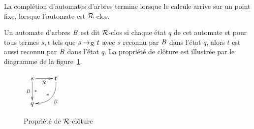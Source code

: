 




La complétion d'automates d'arbres termine lorsque le calcule arrive sur un point fixe,
lorsque l'automate est $\mathcal R$-clos.


\begin{definition}
  Un automate d'arbres $\mathit B$ est dit $\mathcal R$-clos si chaque état $q$ de cet automate et pour tous termes $s,t$ tels que 
  $s \rightarrow_\mathcal R t$ avec $s$ reconnu par $\mathit B$ dans l'état $q$, alors $t$ est aussi reconnu par $\mathit B$ dans l'état $q$.
  La propriété de clôture est illustrée par le diagramme de la figure~\ref{fig:R-cloture}.
  \begin{figure}[ht!]
    \centering
    $
    \xymatrix{
      s \ar[r]_{\R}\ar[d]^{*}_{\B} & t \ar@/^1.2pc/[ld]_{*}^{\B}\\
      q & %
    }
    $
    \caption{\footnotesize Propriété de $\mathcal R$-clôture}
    \label{fig:R-cloture}
  \end{figure}
\end{definition}

